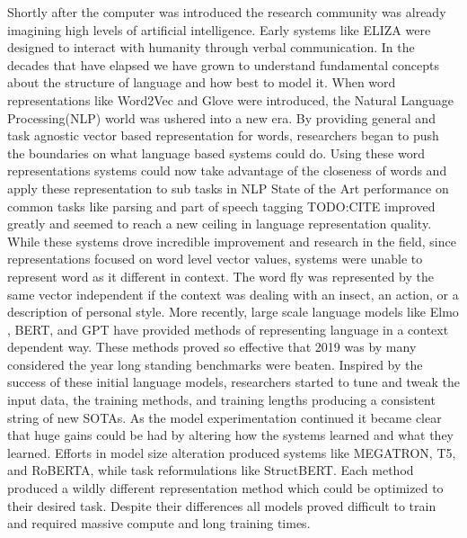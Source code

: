 \documentclass [11pt, proquest] {uwthesis}[2020/08/20]
\begin{document}
Shortly after the computer was introduced the research community was already imagining high levels of artificial intelligence. Early systems like ELIZA \cite{Weizenbaum1966ELIZAA} were designed to interact with humanity through verbal communication. In the decades that have elapsed we have grown to understand fundamental concepts about the structure of language and how best to model it. When word representations like Word2Vec \cite{Mikolov2013EfficientEO} and Glove \cite{Pennington2014GloveGV} were introduced, the Natural Language Processing(NLP) world was ushered into a new era. By providing general and task agnostic vector based representation for words, researchers began to push the boundaries on what language based systems could do. Using these word representations systems could now take advantage of the closeness of words and apply these representation to sub tasks in NLP State of the Art performance on common tasks like parsing and part of speech tagging TODO:CITE improved greatly and seemed to reach a new ceiling in language representation quality. \\ While these systems drove incredible improvement and research in the field, since representations focused on word level vector values, systems were unable to represent word as it different in context. The word fly was represented by the same vector independent if the context was dealing with an insect, an action, or a description of personal style. More recently, large scale language models like Elmo \cite{Peters2018DeepCW}, BERT, and GPT have provided methods of representing language in a context dependent way. These methods proved so effective that 2019 was by many considered the year long standing benchmarks were beaten. Inspired by the success of these initial language models, researchers started to tune and tweak the input data, the training methods, and training lengths producing a consistent string of new SOTAs. As the model experimentation continued it became clear that huge gains could be had by altering how the systems learned and what they learned. Efforts in model size alteration produced systems like MEGATRON, T5, and RoBERTA, while task reformulations like StructBERT. Each method produced a wildly different representation method which could be optimized to their desired task. Despite their differences all models proved difficult to train and required massive compute and long training times.   \\
\end{document}
